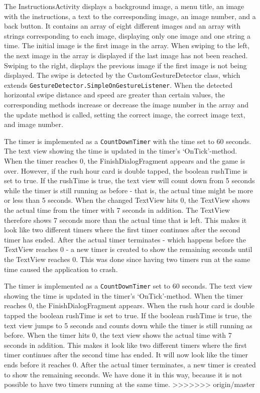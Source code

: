 The InstructionsActivity displays a background image, a menu title, an image with the instructions, a text to the corresponding image, an image number, and a back button. It contains an array of eight different images and an array with strings corresponding to each image, displaying only one image and one string a time. The initial image is the first image in the array. When swiping to the left, the next image in the array is displayed if the last image has not been reached. Swiping to the right, displays the previous image if the first image is not being displayed. The swipe is detected by the CustomGestureDetector class, which extends \verb|GestureDetector.SimpleOnGestureListener|. When the detected horizontal swipe distance and speed are greater than certain values, the corresponding methods increase or decrease the image number in the array and the update method is called, setting the correct image, the correct image text, and image number. \newline

\newpage
The timer is implemented as a \verb|CountDownTimer| with the time set to 60 seconds. The text view showing the time is updated in the timer’s ‘OnTick’-method.  When the timer reaches 0, the FinishDialogFragment appears and the game is over. However, if the rush hour card is double tapped, the boolean rushTime is set to true. If the rushTime is true, the text view will count down from 5 seconds while the timer is still running as before -  that is, the actual time might be more or less than 5 seconds. When the changed TextView hits 0, the TextView shows the actual time from the timer with 7 seconds in addition. The TextView therefore shows 7 seconds more than the actual time that is left. This makes it look like two different timers where the first timer continues after the second timer has ended. After the actual timer terminates - which happens before the TextView reaches 0 - a new timer is created to show the remaining seconds until the TextView reaches 0. This was done since having two timers run at the same time caused the application to crash.  

The timer is implemented as a \verb|CountDownTimer| set to 60 seconds. The text view showing the time is updated in the timer’s ‘OnTick’-method.  When the timer reaches 0, the FinishDialogFragment appears. When the rush hour card is double tapped the boolean rushTime is set to true. If the boolean rushTime is true, the text view jumps to 5 seconds and counts down while the timer is still running as before. When the timer hits 0, the text view shows the actual time with 7 seconds in addition. This makes it look like two different timers where the first timer continues after the second time has ended.  It will now look like the timer ends before it reaches 0. After the actual timer terminates, a new timer is created to show the remaining seconds. We have done it in this way, because it is not possible to have two timers running at the same time. 
>>>>>>> origin/master


